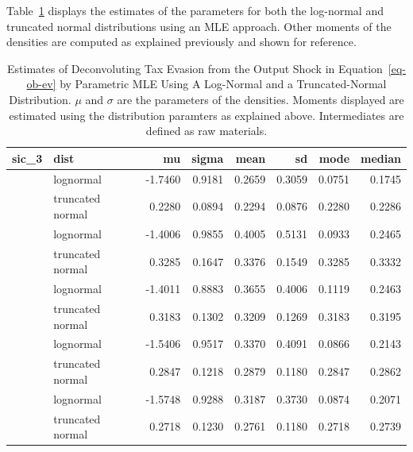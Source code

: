 \documentclass[
  12pt]{article}
\theoremstyle{definition}
\theoremstyle{remark}
\begin{document}
Table~\ref{tbl-deconv-mle-both} displays the estimates of the parameters
for both the log-normal and truncated normal distributions using an MLE
approach. Other moments of the densities are computed as explained
previously and shown for reference.

\begin{longtable}[t]{llrrrrrr}

\caption{\label{tbl-deconv-mle-both}Estimates of Deconvoluting Tax
Evasion from the Output Shock in Equation~\ref{eq-ob-ev} by Parametric
MLE Using A Log-Normal and a Truncated-Normal Distribution. \(\mu\) and
\(\sigma\) are the parameters of the densities. Moments displayed are
estimated using the distribution paramters as explained above.
Intermediates are defined as raw materials.}

\tabularnewline

\toprule
sic\_3 & dist & mu & sigma & mean & sd & mode & median\\
\midrule
 & lognormal & -1.7460 & 0.9181 & 0.2659 & 0.3059 & 0.0751 & 0.1745\\
\cmidrule{2-8}\nopagebreak
\multirow[t]{-2}{*}{\raggedright\arraybackslash 311} & truncated normal & 0.2280 & 0.0894 & 0.2294 & 0.0876 & 0.2280 & 0.2286\\
\cmidrule{1-8}\pagebreak[0]
 & lognormal & -1.4006 & 0.9855 & 0.4005 & 0.5131 & 0.0933 & 0.2465\\
\cmidrule{2-8}\nopagebreak
\multirow[t]{-2}{*}{\raggedright\arraybackslash 313} & truncated normal & 0.3285 & 0.1647 & 0.3376 & 0.1549 & 0.3285 & 0.3332\\
\cmidrule{1-8}\pagebreak[0]
 & lognormal & -1.4011 & 0.8883 & 0.3655 & 0.4006 & 0.1119 & 0.2463\\
\cmidrule{2-8}\nopagebreak
\multirow[t]{-2}{*}{\raggedright\arraybackslash 321} & truncated normal & 0.3183 & 0.1302 & 0.3209 & 0.1269 & 0.3183 & 0.3195\\
\cmidrule{1-8}\pagebreak[0]
 & lognormal & -1.5406 & 0.9517 & 0.3370 & 0.4091 & 0.0866 & 0.2143\\
\cmidrule{2-8}\nopagebreak
\multirow[t]{-2}{*}{\raggedright\arraybackslash 352} & truncated normal & 0.2847 & 0.1218 & 0.2879 & 0.1180 & 0.2847 & 0.2862\\
\cmidrule{1-8}\pagebreak[0]
 & lognormal & -1.5748 & 0.9288 & 0.3187 & 0.3730 & 0.0874 & 0.2071\\
\cmidrule{2-8}\nopagebreak
\multirow[t]{-2}{*}{\raggedright\arraybackslash 383} & truncated normal & 0.2718 & 0.1230 & 0.2761 & 0.1180 & 0.2718 & 0.2739\\
\bottomrule

\end{longtable}
\end{document}

